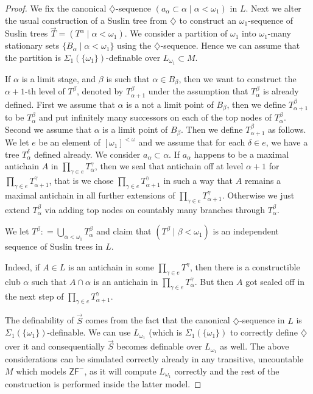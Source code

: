 \documentclass[a4paper,11pt]{article}
\newcommand{\ZF}{\mathsf{ZF}}
\begin{document}
\begin{proof}
We fix the canonical $\diamondsuit$-sequence $(a_{\alpha} \subset \alpha \mid \alpha< \omega_1)$ in $L$. 
Next we alter the usual construction of a Suslin tree from $\diamondsuit$ to construct an $\omega_1$-sequence of Suslin trees $\vec{T}= (T^{\alpha} \mid \alpha < \omega_1)$. We consider a partition of $\omega_1$ into $\omega_1$-many stationary  sets $\{ B_{\alpha } \mid \alpha < \omega_1 \}$ using the $\diamondsuit$-sequence. Hence we can assume that the partition is $\Sigma_1 ( \{ \omega_1 \} )$-definable over $L_{\omega_1} \subset M$.

If $\alpha$ is a limit stage, and $\beta$ is such that  $\alpha \in B_{\beta}$, then we want to construct the $\alpha+1$-th level of $T^{\beta}$, denoted by $T_{\alpha+1}^{\beta}$ under the assumption that $T_{\alpha}^{\beta}$ is already defined. 
First we assume that $\alpha$ is a not a limit point of $B_{\beta}$, then we define
$T_{\alpha+1}^{\beta}$ to be $T_{\alpha}^{\beta}$ and put infinitely many successors on each of the top nodes of $T^{\beta}_{\alpha}$.
Second we assume that $\alpha$ is a limit point of $B_{\beta}$. Then we define $T_{\alpha+1}^{\beta}$ as follows. We let $e$ be an element of $[\omega_1]^{<\omega}$ and we assume that for each $\delta \in e$, we have a tree $T^{\delta}_{\alpha}$ defined already.
We consider $a_{\alpha} \subset \alpha$. If $a_{\alpha}$ happens to be a maximal antichain $A$ in $\prod_{\gamma \in e} T^{\gamma}_{\alpha}$, then we seal that antichain off at level $\alpha+1$ for $ \prod_{\gamma \in e} T^{\gamma}_{\alpha+1}$, that is we chose $ \prod_{\gamma \in e} T^{\gamma}_{\alpha+1}$ in such a way that $A$ remains a maximal antichain in all further extensions of $ \prod_{\gamma \in e} T^{\gamma}_{\alpha+1}$.
Otherwise we just extend $T^{\beta}_{\alpha}$ via adding top nodes on countably many branches through $T^{\beta}_{\alpha}$.

We let $T^{\beta}: = \bigcup_{\alpha < \omega_1} T^{\beta}_{\alpha}$ and claim that 
$(T^{\beta} \mid \beta < \omega_1)$ is an independent sequence of Suslin trees in $L$.

Indeed, if $A \in L$ is an antichain in some $\prod_{\gamma \in e} T^{\gamma}$, then there is a constructible club $\alpha$ such that $A \cap \alpha$ is an antichain in $\prod_{\gamma \in e} T^{\gamma}_{\alpha}$. But then $A$ got sealed off in the next step of $\prod_{\gamma \in e} T^{\gamma}_{\alpha+1}$.


The definability of $\vec{S}$ comes from the fact that the canonical $\diamondsuit$-sequence in $L$ is $\Sigma_1 (\{ \omega_1 \})$-definable. We can use $L_{\omega_1}$ (which is $\Sigma_1( \{\omega_1 \} )$ to correctly define $\diamondsuit$ over it and consequentially $\vec{S}$ becomes definable over $L_{\omega_1}$ as well. The above considerations can be simulated correctly already in any transitive, uncountable $M$ which models $\ZF^{-}$, as it will compute $L_{\omega_1}$ correctly and the rest of the construction is performed inside the latter model. 
\end{proof}
\end{document}
